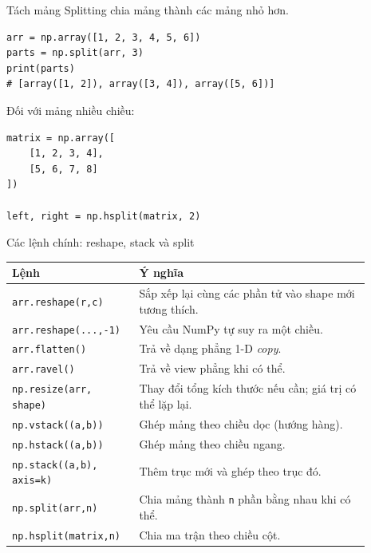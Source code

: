 \documentclass[aspectratio=169,11pt]{beamer}
\begin{document}
\begin{frame}[fragile]{Tách mảng}
\small
Splitting chia mảng thành các mảng nhỏ hơn.
\begin{lstlisting}[style=py]
arr = np.array([1, 2, 3, 4, 5, 6])
parts = np.split(arr, 3)
print(parts)
# [array([1, 2]), array([3, 4]), array([5, 6])]
\end{lstlisting}
Đối với mảng nhiều chiều:
\begin{lstlisting}[style=py]
matrix = np.array([
    [1, 2, 3, 4],
    [5, 6, 7, 8]
])

left, right = np.hsplit(matrix, 2)
\end{lstlisting}
\end{frame}

\begin{frame}{Các lệnh chính: reshape, stack và split}
\scriptsize
\begin{tabular}{p{0.29\linewidth}p{0.60\linewidth}}
\toprule
\textbf{Lệnh} & \textbf{Ý nghĩa} \\
\midrule
\texttt{arr.reshape(r,c)} & Sắp xếp lại cùng các phần tử vào shape mới tương thích. \\
\texttt{arr.reshape(...,-1)} & Yêu cầu NumPy tự suy ra một chiều. \\
\texttt{arr.flatten()} & Trả về dạng phẳng 1-D \emph{copy}. \\
\texttt{arr.ravel()} & Trả về view phẳng khi có thể. \\
\texttt{np.resize(arr, shape)} & Thay đổi tổng kích thước nếu cần; giá trị có thể lặp lại. \\
\texttt{np.vstack((a,b))} & Ghép mảng theo chiều dọc (hướng hàng). \\
\texttt{np.hstack((a,b))} & Ghép mảng theo chiều ngang. \\
\texttt{np.stack((a,b), axis=k)} & Thêm trục mới và ghép theo trục đó. \\
\texttt{np.split(arr,n)} & Chia mảng thành \texttt{n} phần bằng nhau khi có thể. \\
\texttt{np.hsplit(matrix,n)} & Chia ma trận theo chiều cột. \\
\bottomrule
\end{tabular}
\end{frame}
\end{document}
